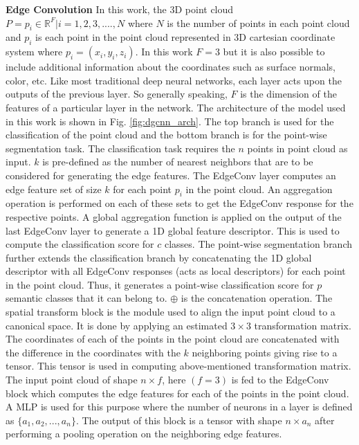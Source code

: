\vspace{5mm}

\textbf{Edge Convolution}  In this work, the 3D point cloud $P = {p_i \in \mathbb{R}^F|i = 1, 2, 3, ...., N}$ where $N$ is the number of points in each point cloud and $p_i$ is each point in the point cloud represented in 3D cartesian coordinate system where $p_i = (x_i,y_i,z_i)$. In this work $F=3$ but it is also possible to include additional information about the coordinates such as surface normals, color, etc. Like most traditional deep neural networks, each layer acts upon the outputs of the previous layer. So generally speaking, $F$ is the dimension of the features of a particular layer in the network. The architecture of the model used in this work is shown in Fig. \ref{fig:dgcnn_arch}. The top branch is used for the classification of the point cloud and the bottom branch is for the point-wise segmentation task. The classification task requires the $n$ points in point cloud as input. $k$ is pre-defined as the number of nearest neighbors that are to be considered for generating the edge features. The EdgeConv layer computes an edge feature set of size $k$ for each point $p_i$ in the point cloud. An aggregation operation is performed on each of these sets to get the EdgeConv response for the respective points. A global aggregation function is applied on the output of the last EdgeConv layer to generate a 1D global feature descriptor. This is used to compute the classification score for $c$ classes. The point-wise segmentation branch  further extends the classification branch by concatenating the 1D global descriptor with all EdgeConv responses (acts as local descriptors) for each point in the point cloud. Thus, it generates a point-wise classification score for $p$ semantic classes that it can belong to. $\oplus$ is the concatenation operation. The spatial transform block is the module used to align the input point cloud to a canonical space. It is done by applying an estimated $3 \times 3$ transformation matrix. The coordinates of each of the points in the point cloud are concatenated with the difference in the coordinates with the $k$ neighboring points giving rise to a tensor. This tensor is used in computing above-mentioned transformation matrix. The input point cloud of shape $n \times f$, here $(f=3)$ is fed to the EdgeConv block which computes the edge features for each of the points in the point cloud. A \ac{MLP} is used for this purpose where the number of neurons in a layer is defined as $\{a_1, a_2, ... , a_n\}.$ The output of this block is a tensor with shape $n \times a_n$ after performing a pooling operation on the neighboring edge features.  
